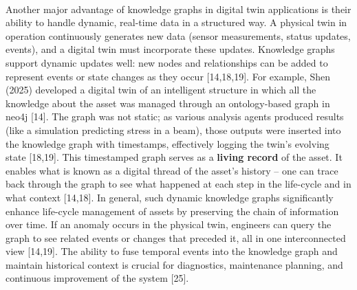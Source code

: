         \paragraph{} Another major advantage of knowledge graphs in digital twin applications is their ability to handle dynamic, real-time data in a structured way. A physical twin in operation continuously generates new data (sensor measurements, status updates, events), and a digital twin must incorporate these updates. Knowledge graphs support dynamic updates well: new nodes and relationships can be added to represent events or state changes as they occur [14,18,19]. For example, Shen (2025) developed a digital twin of an intelligent structure in which all the knowledge about the asset was managed through an ontology-based graph in neo4j [14]. The graph was not static; as various analysis agents produced results (like a simulation predicting stress in a beam), those outputs were inserted into the knowledge graph with timestamps, effectively logging the twin’s evolving state [18,19]. This timestamped graph serves as a \textbf{living record} of the asset. It enables what is known as a digital thread of the asset’s history – one can trace back through the graph to see what happened at each step in the life-cycle and in what context [14,18]. In general, such dynamic knowledge graphs significantly enhance life-cycle management of assets by preserving the chain of information over time. If an anomaly occurs in the physical twin, engineers can query the graph to see related events or changes that preceded it, all in one interconnected view [14,19]. The ability to fuse temporal events into the knowledge graph and maintain historical context is crucial for diagnostics, maintenance planning, and continuous improvement of the system [25].
        
        \newpage
